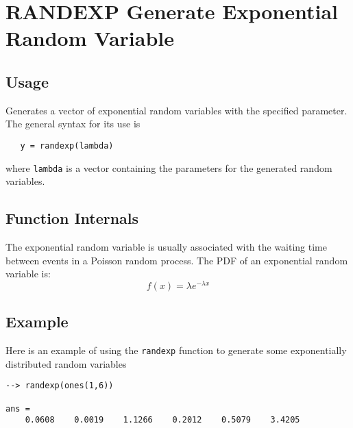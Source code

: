\section{RANDEXP Generate Exponential Random Variable}

\subsection{Usage}

Generates a vector of exponential random variables with
the specified parameter.  The general syntax for its use is
\begin{verbatim}
   y = randexp(lambda)
\end{verbatim}
where \verb|lambda| is a vector containing the parameters for
the generated random variables.
\subsection{Function Internals}

The exponential random variable is usually associated with
the waiting time between events in a Poisson random process.
The PDF of an exponential random variable is:
\[
   f(x) = \lambda e^{-\lambda x}
\]
\subsection{Example}

Here is an example of using the \verb|randexp| function to generate
some exponentially distributed random variables
\begin{verbatim}
--> randexp(ones(1,6))

ans = 
    0.0608    0.0019    1.1266    0.2012    0.5079    3.4205 
\end{verbatim}
